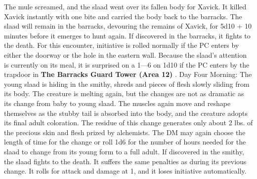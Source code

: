 \documentclass[a5paper,11pt,twoside]{book}
\newcommand{\MapText}[1]{
	{\color{DarkCyan} \textbf{#1}}
}
\begin{document}
{{{{The mule screamed, and the slaad went over its fallen body for Xavick.
It killed Xavick instantly with one bite and carried the body back to the barracks.
The slaad will remain in the barracks, devouring the remains of Xavick, for 5d10 + 10 minutes before it emerges to hunt again.
If discovered in the barracks, it fights to the death.
For this encounter, initiative is rolled normally if the PC enters by either the doorway or the hole in the eastern wall.
Because the slaad’s attention is currently on its meal, it is surprised on a 1—6 on 1d10 if the PC enters by the trapdoor in \MapText{The Barracks Guard Tower (Area 12)}.
 Day Four Morning: The young slaad is hiding in the smithy, shreds and pieces of flesh slowly sliding from its body.
The creature is melting again, but the changes are not as dramatic as its change from baby to young slaad.
The muscles again move and reshape themselves as the stubby tail is absorbed into the body, and the creature adopts its final adult coloration.
The residue of this change generates only about 2 lbs.
of the precious skin and flesh prized by alchemists.
The DM may again choose the length of time for the change or roll 1d6 for the number of hours needed for the slaad to change from its young form to a full adult.
If discovered in the smithy, the slaad fights to the death.
It suffers the same penalties as during its previous change.
It rolls for attack and damage at 1, and it loses initiative automatically.

}}}}
\end{document}
